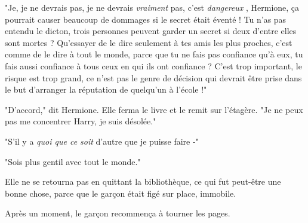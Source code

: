 "Je, je ne devrais pas, je ne devrais \emph{vraiment}  pas, c'est \emph{dangereux} , Hermione, ça pourrait causer beaucoup de dommages si le secret était éventé ! Tu n'as pas entendu le dicton, trois personnes peuvent garder un secret si deux d'entre elles sont mortes ? Qu'essayer de le dire seulement à tes amis les plus proches, c'est comme de le dire à tout le monde, parce que tu ne fais pas confiance qu'à eux, tu fais aussi confiance à tous ceux en qui ils ont confiance ? C'est trop important, le risque est trop grand, ce n'est pas le genre de décision qui devrait être prise dans le but d'arranger la réputation de quelqu'un à l'école !"

"D'accord," dit Hermione. Elle ferma le livre et le remit sur l'étagère. "Je ne peux pas me concentrer Harry, je suis désolée."

"S'il y a \emph{quoi que ce soit}  d'autre que je puisse faire -"

"Sois plus gentil avec tout le monde."

Elle ne se retourna pas en quittant la bibliothèque, ce qui fut peut-être une bonne chose, parce que le garçon était figé sur place, immobile.

Après un moment, le garçon recommença à tourner les pages.


